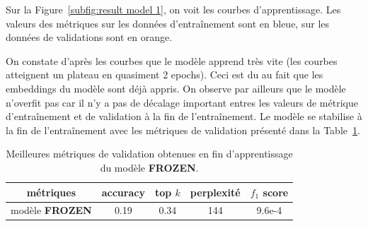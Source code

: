 \documentclass[a4paper]{article}
\begin{document}
Sur la Figure~\ref{subfig:result model 1}, on voit les courbes d'apprentissage. Les valeurs des métriques sur les données d'entraînement sont en bleue, sur les données de validations sont en orange.

On constate d'après les courbes que le modèle apprend très vite (les courbes atteignent un plateau en quasiment 2 epochs). Ceci est du au fait que les embeddings du modèle sont déjà appris. On observe par ailleurs que le modèle n'overfit pas car il n'y a pas de décalage important entres les valeurs de métrique d'entraînement et de validation à la fin de l'entraînement. Le modèle se stabilise à la fin de l'entraînement avec les métriques de validation présenté dans la Table~\ref{tab:metriques model1}.


\begin{table}
    \centering
    \begin{tabular}{|c|c|c|c|c|}
        \hline
        métriques & accuracy  & top $k$  & perplexité  & $f_1$ score \\
        \hline
        modèle \textbf{FROZEN} & 0.19 & 0.34  & 144 & 9.6e-4 \\
        \hline
    \end{tabular}
    \caption{Meilleures métriques de validation obtenues en fin d'apprentissage du modèle \textbf{FROZEN}.}
    \label{tab:metriques model1}
\end{table}
\end{document}
